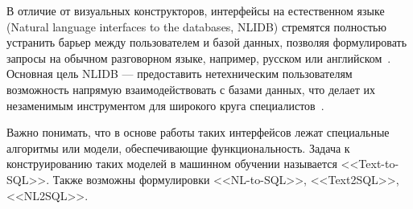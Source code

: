 В отличие от визуальных конструкторов, интерфейсы на естественном языке
(Natural language interfaces to the databases, NLIDB) стремятся полностью устранить
барьер между пользователем и базой данных, позволяя формулировать запросы на обычном разговорном языке,
например, русском или английском~\cite{anisyahNaturalLanguageInterface2019,
      bolyabkinIntellektualnayaSistemaDlya2021, borodinZadacheSostavleniyaZaprosov2016}.
Основная цель NLIDB --- предоставить нетехническим пользователям
возможность напрямую взаимодействовать с базами данных,
что делает их незаменимым инструментом для широкого круга
специалистов~\cite{desaiNaturalLanguageInterface2023, kumarEnhancingRelationalDatabase2024}.

Важно понимать, что в основе работы таких интерфейсов лежат специальные алгоритмы или модели,
обеспечивающие функциональность. Задача к конструированию таких моделей в машинном обучении
называется <<Text-to-SQL>>. Также возможны формулировки <<NL-to-SQL>>, <<Text2SQL>>, <<NL2SQL>>.

